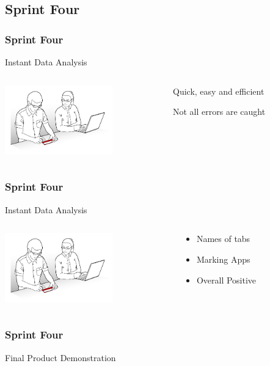 \subsection{Sprint Four}
\begin{frame}
\frametitle{Sprint Four}
\begin{center}
Instant Data Analysis\\
\begin{columns}
\begin{column}{0.5\textwidth}
\includegraphics[height=3cm]{images/usertest}
\end{column}
\begin{column}{0.5\textwidth}

\begin{description}
\item<1>[Strengths:] Quick, easy and efficient
\item<2>[Weaknesses:] Not all errors are caught
\end{description}

\end{column}
\end{columns}
\end{center}
\end{frame}


\begin{frame}
\frametitle{Sprint Four}
\begin{center}
Instant Data Analysis\\
\begin{columns}
\begin{column}{0.5\textwidth}
\includegraphics[height=3cm]{images/usertest}
\end{column}
\begin{column}{0.5\textwidth}

\begin{itemize}
\item<1>Names of tabs
\item<2>Marking Apps
\item<3>Overall Positive
\end{itemize}

\end{column}
\end{columns}
\end{center}
\end{frame}

\begin{frame}

\frametitle{Sprint Four}
\begin{center}
Final Product Demonstration
\end{center}
\end{frame}